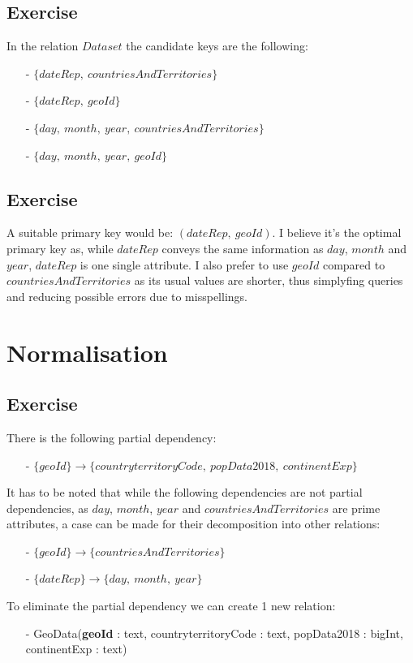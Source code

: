 \documentclass{article}
\newcounter{ex}
\newcommand{\exercise}{
\stepcounter{ex}
\subsection{Exercise \arabic{ex}}
}
\begin{document}
\exercise
In the relation $Dataset$ the candidate keys are the following:
\begin{itemize}
    \item[-] $\{ dateRep,\ countriesAndTerritories  \}$
    \item[-] $\{ dateRep,\ geoId  \}$
    \item[-] $\{ day,\ month,\ year,\ countriesAndTerritories  \}$
    \item[-] $\{ day,\ month,\ year,\ geoId  \}$
\end{itemize}

\exercise
A suitable primary key would be: $(dateRep,\ geoId)$. \newline
I believe it's the optimal primary key as, while $dateRep$ conveys the same information as $day$, $month$ and $year$, $dateRep$ is one single attribute.\newline
I also prefer to use $geoId$ compared to $countriesAndTerritories$ as its usual values are shorter, thus simplyfing queries and reducing possible errors due to misspellings.

\section{Normalisation}

\exercise
There is the following partial dependency:
\begin{itemize}
    \item[-] $\{ geoId  \} \rightarrow \{countryterritoryCode,\ popData2018,\ continentExp \}$
\end{itemize}
It has to be noted that while the following dependencies are not partial dependencies, as $day$, $month$, $year$ and $countriesAndTerritories$ are prime attributes, a case can be made for their decomposition into other relations:
\begin{itemize}
    \item[-] $\{ geoId \} \rightarrow \{ countriesAndTerritories \}$
    \item[-] $\{ dateRep  \} \rightarrow \{ day,\ month,\ year \}$ 
\end{itemize}
To eliminate the partial dependency we can create 1 new relation:
\begin{itemize}
    \item[-] GeoData(\textbf{geoId} : text, countryterritoryCode : text, popData2018 : bigInt, continentExp : text)
\end{itemize}
\end{document}
